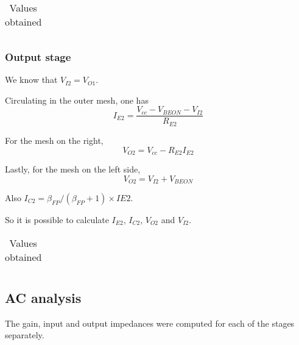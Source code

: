 \begin{table}[H]
  \centering
  \begin{tabular}{|c|c|}
    \hline
      
  \end{tabular}
  \caption{Values obtained}
  \label{tab:resultsDC1}
\end{table}



\subsubsection{Output stage}
We know that $V_{I2}=V_{O1}$.

Circulating in the outer mesh, one has
\begin{equation}
I_{E2} = \frac{V_{cc}-V_{BEON}-V_{I2}}{R_{E2}}
\end{equation}

For the mesh on the right,
\begin{equation}
V_{O2} = V_{cc} -R_{E2} I_{E2}
\end{equation}

Lastly, for the mesh on the left side,
\begin{equation}
V_{O2} = V_{I2} + V_{BEON}
\end{equation}

Also $I_{C2} = \beta_{FP}/(\beta_{FP}+1)\times IE2$.

So it is possible to calculate $I_{E2}$, $I_{C2}$, $V_{O2}$ and $V_{I2}$.

\begin{table}[H]
  \centering
  \begin{tabular}{|c|c|}
    \hline
      
  \end{tabular}
  \caption{Values obtained}
  \label{tab:resultsDC2}
\end{table}





\subsection{AC analysis}
The gain, input and output impedances were computed for each of the stages separately.

